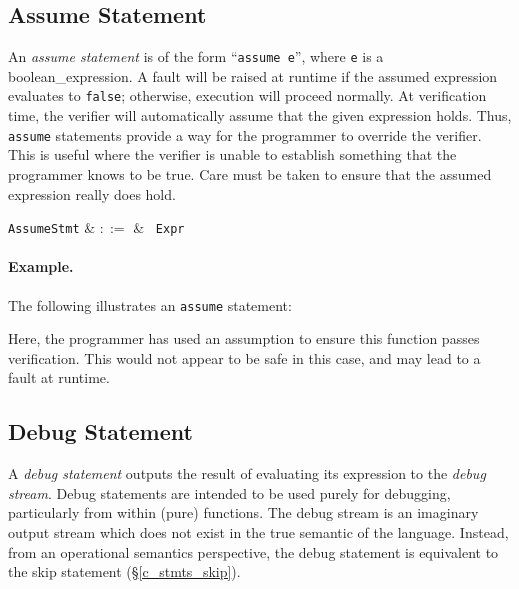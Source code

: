
\subsection{Assume Statement}

An {\em assume statement} is of the form ``\lstinline{assume e}'', where \lstinline{e} is a \gls{boolean_expression}.  A \gls{fault} will be raised at runtime if the assumed expression evaluates to \lstinline{false}; otherwise, execution will proceed normally.  At verification time, the verifier will automatically assume that the given expression holds.  Thus, \lstinline{assume} statements provide a way for the programmer to override the verifier.  This is useful where the verifier is unable to establish something that the programmer knows to be true.  Care must be taken to ensure that the assumed expression really does hold.

\begin{syntax}
  \verb+AssumeStmt+ & $::=$ & \ \verb+Expr+\\
\end{syntax}

\paragraph{Example.} The following illustrates an \lstinline{assume} statement:



Here, the programmer has used an assumption to ensure this function passes verification.  This would not appear to be safe in this case, and may lead to a fault at runtime.



\subsection{Debug Statement}
A {\em debug statement} outputs the result of evaluating its expression to the {\em debug stream}.  Debug statements are intended to be used purely for debugging, particularly from within (pure) functions.  The debug stream is an imaginary output stream which does not exist in the true semantic of the language.  Instead, from an operational semantics perspective, the debug statement is equivalent to the skip statement (\S\ref{c_stmts_skip}).

